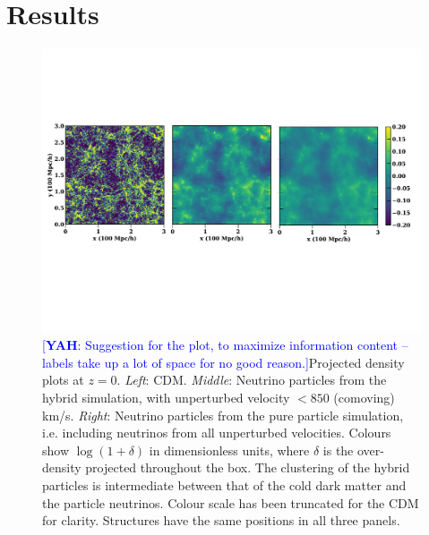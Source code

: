 \documentclass[useAMS, usenatbib]{mnras}
\newcommand{\yah}[1]{{\textcolor{blue}{[{\bf YAH}: #1]}}}
\begin{document}

\section{Results}
\label{sec:results}

\begin{figure}
\includegraphics[width = \textwidth]{nuplots/slices.pdf}
  \caption{\yah{Suggestion for the plot, to maximize information content -- labels take up a lot of space for no good reason.}Projected density plots at $z=0$. \emph{Left}: CDM. \emph{Middle}: Neutrino particles from the hybrid simulation, with unperturbed velocity $<850$ (comoving) km/s. \emph{Right}: Neutrino particles from the pure particle simulation, i.e. including neutrinos from all unperturbed velocities. Colours show $\log (1+ \delta)$ in dimensionless units, where $\delta$ is the over-density projected throughout the box.
  The clustering of the hybrid particles is intermediate between that of the cold dark matter and the particle neutrinos. Colour scale has been truncated for the CDM for clarity. Structures have the same positions in all three panels.
  }
  \label{fig:density_plot}
\end{figure}
\end{document}
